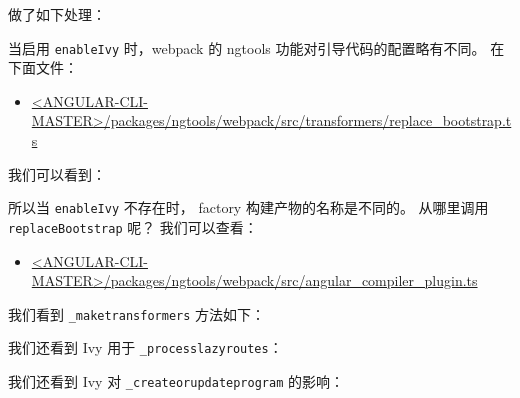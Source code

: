 
做了如下处理：




当启用 \texttt{enableIvy} 时，webpack 的 ngtools 功能对引导代码的配置略有不同。
在下面文件：

\begin{itemize}
  \item \href{https://github.com/angular/angular-cli/blob/master/packages/ngtools/webpack/src/transformers/replace_bootstrap.ts}
        {<ANGULAR-CLI-MASTER>/packages/ngtools/webpack/src/transformers/replace\_bootstrap.ts}
\end{itemize}


我们可以看到：




所以当 \texttt{enableIvy} 不存在时，
factory 构建产物的名称是不同的。
从哪里调用 \texttt{replaceBootstrap} 呢？
我们可以查看：

\begin{itemize}
  \item \href{https://github.com/angular/angular-cli/blob/master/packages/ngtools/webpack/src/angular_compiler_plugin.ts}
        {<ANGULAR-CLI-MASTER>/packages/ngtools/webpack/src/angular\_compiler\_plugin.ts}
\end{itemize}


我们看到 \texttt{\_maketransformers} 方法如下：




我们还看到 Ivy 用于 \texttt{\_processlazyroutes}：




我们还看到 Ivy 对 \texttt{\_createorupdateprogram} 的影响：




